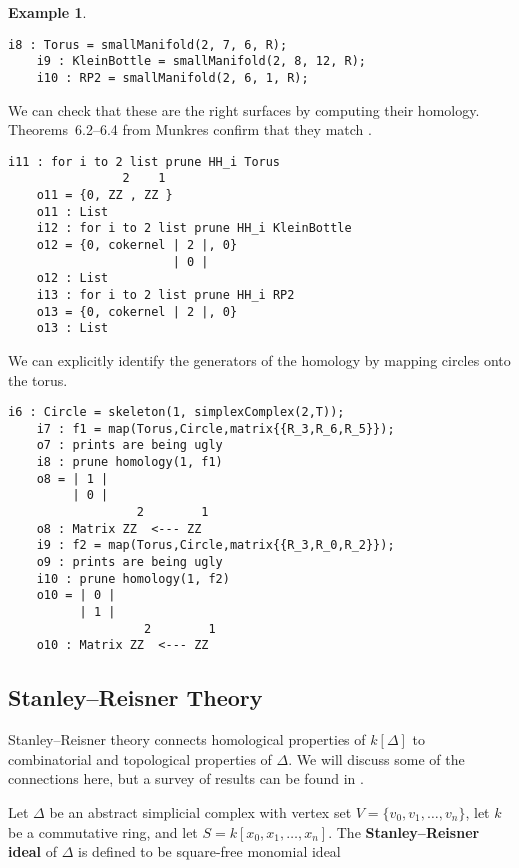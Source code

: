\documentclass[12pt,leqno]{amsart}
\theoremstyle{definition}
\newtheorem{example}[lemma]{Example}
\begin{document}
\begin{example}
  \label{E: common surfaces and homology}
\begin{lstlisting}[basicstyle={\ttfamily \scriptsize}, xleftmargin=-23pt]
    i8 : Torus = smallManifold(2, 7, 6, R);
    i9 : KleinBottle = smallManifold(2, 8, 12, R);
    i10 : RP2 = smallManifold(2, 6, 1, R);
\end{lstlisting}
  We can check that these are the right surfaces by computing their
  homology. Theorems~6.2--6.4 from Munkres confirm that they match
  \cite{Munkres}.
\begin{lstlisting}[basicstyle={\ttfamily \scriptsize}, xleftmargin=-23pt]
    i11 : for i to 2 list prune HH_i Torus
                2    1
    o11 = {0, ZZ , ZZ }
    o11 : List
    i12 : for i to 2 list prune HH_i KleinBottle
    o12 = {0, cokernel | 2 |, 0}
                       | 0 |
    o12 : List
    i13 : for i to 2 list prune HH_i RP2
    o13 = {0, cokernel | 2 |, 0}
    o13 : List
\end{lstlisting}
  We can explicitly identify the generators of the homology by mapping circles
  onto the torus.
\begin{lstlisting}[basicstyle={\ttfamily \scriptsize}, xleftmargin=-23pt]
    i6 : Circle = skeleton(1, simplexComplex(2,T));
    i7 : f1 = map(Torus,Circle,matrix{{R_3,R_6,R_5}});
    o7 : prints are being ugly
    i8 : prune homology(1, f1)
    o8 = | 1 |
         | 0 |
                  2        1
    o8 : Matrix ZZ  <--- ZZ
    i9 : f2 = map(Torus,Circle,matrix{{R_3,R_0,R_2}});
    o9 : prints are being ugly
    i10 : prune homology(1, f2)
    o10 = | 0 |
          | 1 |
                   2        1
    o10 : Matrix ZZ  <--- ZZ
\end{lstlisting}
\end{example}

\subsection{Stanley--Reisner Theory}
\addtocounter{section}{1}
\label{S:Stanley--Reisner Theory}

\noindent
Stanley--Reisner theory connects homological properties of $k[\Delta]$ to
combinatorial and topological properties of $\Delta$. We will discuss some of
the connections here, but a survey of results can be found in
\cites{BH, Stanley, MS}.

Let $\Delta$ be an abstract simplicial complex with vertex set
$V = \{v_0,v_1,\dotsc,v_n\}$, let $k$ be a commutative ring, and let
$S = k[x_0,x_1,\dotsc,x_n]$. The \textbf{Stanley--Reisner ideal} of $\Delta$
is defined to be square-free monomial ideal
\end{document}
